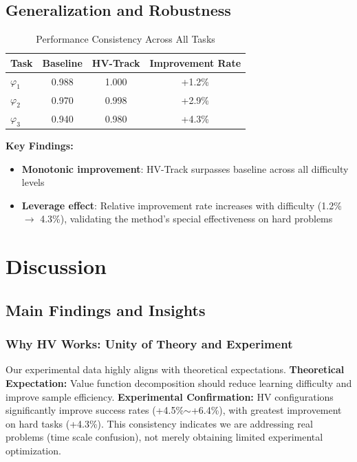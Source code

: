 \documentclass[conference]{IEEEtran}
\begin{document}
\subsection{Generalization and Robustness}

\begin{table}[t]
\centering
\caption{Performance Consistency Across All Tasks}
\label{tab:performance_consistency}
\begin{tabular}{@{}lccc@{}}
\toprule
\textbf{Task} & \textbf{Baseline} & \textbf{HV-Track} & \textbf{Improvement Rate} \\ \midrule
$\varphi_1$ & 0.988 & 1.000 & +1.2\% \\
$\varphi_2$ & 0.970 & 0.998 & +2.9\% \\
$\varphi_3$ & 0.940 & 0.980 & +4.3\% \\ \bottomrule
\end{tabular}
\end{table}

\textbf{Key Findings:}
\begin{itemize}
    \item \textbf{Monotonic improvement}: HV-Track surpasses baseline across all difficulty levels
    \item \textbf{Leverage effect}: Relative improvement rate increases with difficulty (1.2\% $\rightarrow$ 4.3\%), validating the method's special effectiveness on hard problems
\end{itemize}

\section{Discussion}
\label{sec:discussion}

\subsection{Main Findings and Insights}

\subsubsection{Why HV Works: Unity of Theory and Experiment}

Our experimental data highly aligns with theoretical expectations. \textbf{Theoretical Expectation:} Value function decomposition should reduce learning difficulty and improve sample efficiency. \textbf{Experimental Confirmation:} HV configurations significantly improve success rates (+4.5\%$\sim$+6.4\%), with greatest improvement on hard tasks (+4.3\%). This consistency indicates we are addressing real problems (time scale confusion), not merely obtaining limited experimental optimization.
\end{document}
